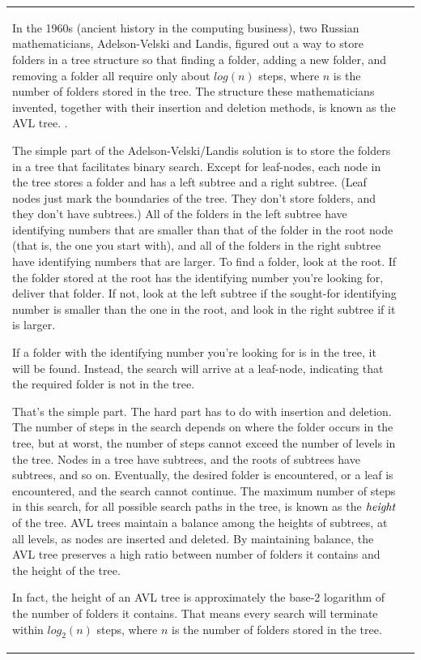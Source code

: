\begin{tabular}{ll}
In the 1960s (ancient history in the computing business),
two Russian mathematicians, Adelson-Velski and Landis,
figured out a way to store folders in a tree structure so that
finding a folder, adding a new folder, and removing a folder all
require only about $log(n)$ steps, where $n$ is the number
of folders stored in the tree. The structure these mathematicians
invented, together with their insertion and deletion methods, is
known as the AVL tree. \label{AVL-tree}.

The simple part of the Adelson-Velski/Landis solution is to store
the folders in a tree that facilitates binary search. Except for
leaf-nodes, each node in the tree stores a folder and has a left
subtree and a right subtree. (Leaf nodes just mark the boundaries of
the tree. They don't store folders, and they don't have subtrees.)
All of the folders in the left subtree have identifying numbers that
are smaller than that of the folder in the root node (that is,
the one you start with), and all of
the folders in the right subtree have identifying numbers that are larger.
To find a folder, look at the root. If the folder stored at
the root has the identifying number you're looking for, deliver that folder.
If not, look at the left subtree if the sought-for identifying number
is smaller than the one in the root, and look in the right subtree
if it is larger.

If a folder with the identifying number you're looking for is in the tree,
it will be found. Instead, the search will arrive at a leaf-node,
indicating that the required folder is not in the tree.

That's the simple part. The hard part has to do with insertion and
deletion. The number of steps in the search depends on where the
folder occurs in the tree, but at worst, the number of steps cannot
exceed the number of levels in the tree. Nodes in a tree have
subtrees, and the roots of subtrees have subtrees, and so on.
Eventually, the desired folder is encountered, or a leaf is
encountered, and the search cannot continue. The maximum number of
steps in this search, for all possible search paths in the tree, is
known as the $\emph{height}$ of the tree.
AVL trees maintain a balance among the heights of subtrees, at all levels, as
nodes are inserted and deleted. By maintaining balance, the AVL tree
preserves a high ratio between number of folders it contains and the
height of the tree.

In fact, the height of an AVL tree is approximately the base-2
logarithm of the number of folders it contains. That means every
search will terminate within $log_2(n)$ steps, where $n$ is the
number of folders stored in the tree.


\end{tabular}
